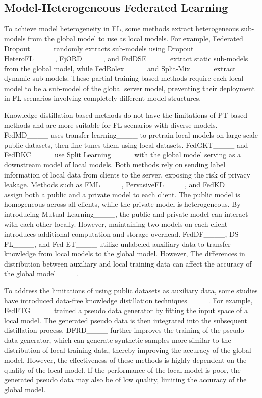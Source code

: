 \subsection{Model-Heterogeneous Federated Learning}

To achieve model heterogeneity in FL, some methods extract heterogeneous sub-models from the global model to use as local models. For example, Federated Dropout____ randomly extracts sub-models using Dropout____. 
HeteroFL____, FjORD____, and FedDSE____ extract static sub-models from the global model, while FedRolex____ and Split-Mix____ extract dynamic sub-models. These partial training-based methods require each local model to be a sub-model of the global server model, preventing their deployment in FL scenarios involving completely different model structures.

Knowledge distillation-based methods do not have the limitations of PT-based methods and are more suitable for FL scenarios with diverse models. FedMD____ uses transfer learning____ to pretrain local models on large-scale public datasets, then fine-tunes them using local datasets. FedGKT____ and FedDKC____ use Split Learning____ with the global model serving as a downstream model of local models. Both methods rely on sending label information of local data from clients to the server, exposing the risk of privacy leakage. Methods such as FML____, PervasiveFL____, and FedKD____ assign both a public and a private model to each client. The public model is homogeneous across all clients, while the private model is heterogeneous. By introducing Mutual Learning____, the public and private model can interact with each other locally. However, maintaining two models on each client introduces additional computation and storage overhead.
FedDF____, DS-FL____, and Fed-ET____ utilize unlabeled auxiliary data to transfer knowledge from local models to the global model. However, The differences in distribution between auxiliary and local training data can affect the accuracy of the global model____.

To address the limitations of using public datasets as auxiliary data, some studies have introduced data-free knowledge distillation techniques____. For example, FedFTG____ trained a pseudo data generator by fitting the input space of a local model. The generated pseudo data is then integrated into the subsequent distillation process. DFRD____ further improves the training of the pseudo data generator, which can generate synthetic samples more similar to the distribution of local training data, thereby improving the accuracy of the global model. However, the effectiveness of these methods is highly dependent on the quality of the local model. If the performance of the local model is poor, the generated pseudo data may also be of low quality, limiting the accuracy of the global model.


